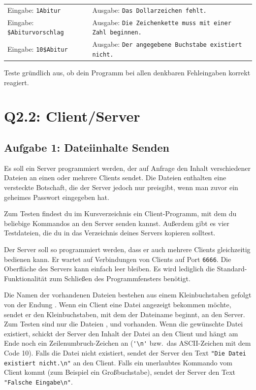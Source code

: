 \bgroup
\def\arraystretch{1.2}
\begin{tabularx}{\textwidth}{p{50mm} X}
Eingabe: \lstinline|1Abitur| &
Ausgabe: \lstinline|Das Dollarzeichen fehlt.| \\
Eingabe: \lstinline|$Abiturvorschlag| &
Ausgabe: \lstinline|Die Zeichenkette muss mit einer Zahl beginnen.| \\
Eingabe: \lstinline|10$Abitur| &
Ausgabe: \lstinline|Der angegebene Buchstabe existiert nicht.| \\
\end{tabularx}
\egroup

Teste gründlich aus, ob dein Programm bei allen denkbaren Fehleingaben korrekt reagiert.


\section{Q2.2: Client/Server}

\subsection{Aufgabe 1: Dateiinhalte Senden}

Es soll ein Server programmiert werden, der auf Anfrage den Inhalt
verschiedener Dateien an einen oder mehrere Clients sendet. Die Dateien
enthalten eine versteckte Botschaft, die der Server jedoch nur preisgibt, wenn
man zuvor ein geheimes Passwort eingegeben hat.

Zum Testen findest du im Kursverzeichnis ein Client-Programm, mit dem du
beliebige Kommandos an den Server senden kannst. Außerdem gibt es vier
Testdateien, die du in das Verzeichnis deines Servers kopieren solltest.

Der Server soll so programmiert werden, dass er auch mehrere Clients
gleichzeitig bedienen kann. Er wartet auf Verbindungen von Clients auf Port
\lstinline|6666|. Die Oberfläche des Servers kann einfach leer bleiben. Es wird
lediglich die Standard-Funktionalität zum Schließen des Programmfensters
benötigt.

Die Namen der vorhandenen Dateien bestehen aus einem Kleinbuchstaben gefolgt
von der Endung . Wenn ein Client eine Datei angezeigt bekommen
möchte, sendet er den Kleinbuchstaben, mit dem der Dateiname beginnt, an den
Server. Zum Testen sind nur die Dateien ,  und
 vorhanden. Wenn die gewünschte Datei existiert, schickt der
Server den Inhalt der Datei an den Client und hängt am Ende noch ein
Zeilenumbruch-Zeichen an (\lstinline|'\n'| bzw.\ das ASCII-Zeichen mit dem Code
10). Falls die Datei nicht existiert, sendet der Server den Text 
\lstinline|"Die Datei existiert nicht.\n"| an den Client. Falls ein unerlaubtes
Kommando vom Client kommt (zum Beispiel ein Großbuchstabe), sendet der Server
den Text \lstinline|"Falsche Eingabe\n"|.

